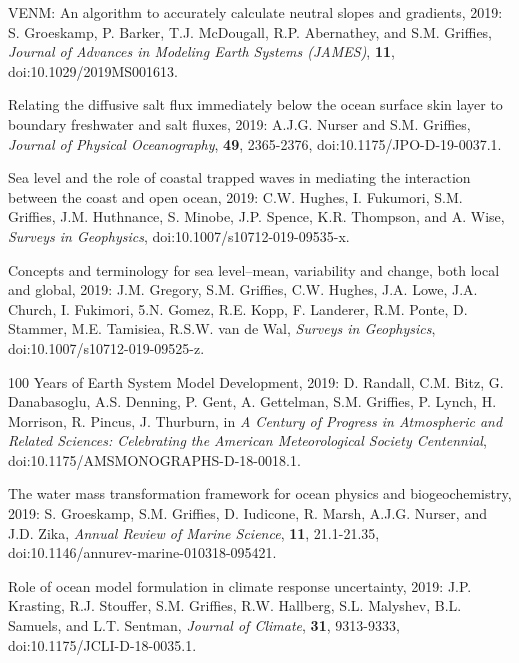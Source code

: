 \begin{etaremune}
\item VENM: An algorithm to accurately calculate neutral slopes and gradients, 2019: S. Groeskamp, P. Barker, T.J. McDougall, R.P. Abernathey, and S.M. Grif\/f\/ies, {\it Journal of Advances in Modeling Earth Systems (JAMES)}, {\bf 11}, doi:10.1029/2019MS001613.

\item Relating the diffusive salt flux immediately below the ocean surface skin layer to boundary freshwater and salt fluxes, 2019: A.J.G. Nurser and S.M. Grif\/f\/ies, {\it Journal of Physical Oceanography}, {\bf 49}, 2365-2376, doi:10.1175/JPO-D-19-0037.1.

\item Sea level and the role of coastal trapped waves in mediating the interaction between the coast and open ocean, 2019: C.W. Hughes, I. Fukumori, S.M. Grif\/f\/ies, J.M. Huthnance, S. Minobe, J.P. Spence, K.R. Thompson, and A. Wise, {\it Surveys in Geophysics},
doi:10.1007/s10712-019-09535-x.

\item Concepts and terminology for sea level--mean, variability and change, both local and global, 2019: J.M. Gregory, S.M. Grif\/f\/ies, C.W. Hughes, J.A. Lowe, J.A. Church, I. Fukimori, 5.N. Gomez, R.E. Kopp, F. Landerer, R.M. Ponte, D. Stammer, M.E. Tamisiea, R.S.W. van de Wal, {\it Surveys in Geophysics},
doi:10.1007/s10712-019-09525-z.

\item 100 Years of Earth System Model Development, 2019: D. Randall, C.M. Bitz, G. Danabasoglu, A.S. Denning, P. Gent, A. Gettelman, S.M. Grif\/f\/ies, P. Lynch, H. Morrison, R. Pincus, J. Thurburn, in {\it A Century of Progress in Atmospheric and Related Sciences: Celebrating the American Meteorological Society Centennial}, doi:10.1175/AMSMONOGRAPHS-D-18-0018.1.

\item The water mass transformation framework for ocean physics and biogeochemistry, 2019: S. Groeskamp, S.M. Grif\/f\/ies, D. Iudicone,  R. Marsh, A.J.G. Nurser, and J.D. Zika, {\it Annual Review of Marine Science}, {\bf 11}, 21.1-21.35, doi:10.1146/annurev-marine-010318-095421.

\item Role of ocean model formulation in climate response uncertainty, 2019: J.P. Krasting, R.J. Stouffer, S.M. Grif\/f\/ies, R.W. Hallberg, S.L. Malyshev, B.L. Samuels, and L.T. Sentman, {\it Journal of Climate}, {\bf 31}, 9313-9333, doi:10.1175/JCLI-D-18-0035.1.


\end{etaremune}
